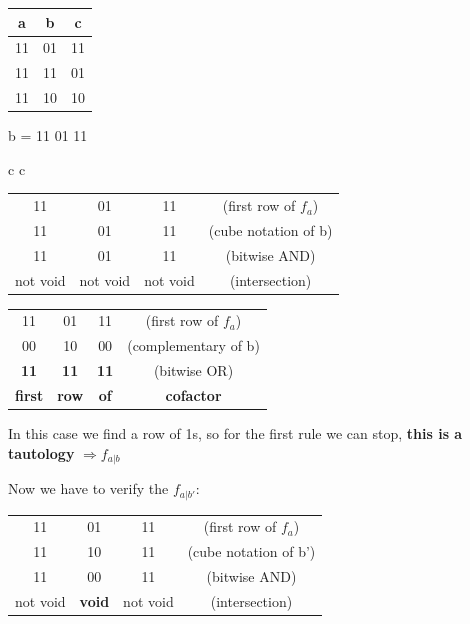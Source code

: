 \begin{center}
		\begin{tabular}{c | c | c}
		a & b & c \\ \hline
		11 & 01 & 11 \\ \hline
		11 & 11 & 01 \\ \hline 
		11 & 10 & 10 \\
	\end{tabular}
\end{center}

b = 11 01 11

\begin{center}
	\begin{tabular}{c c}
		\begin{tabular}{c c c c}
			11 & 01 & 11 & (first row of $f_{a}$) \\ 
			11 & 01 & 11 & (cube notation of b)\\ \hline 
			11 & 01 & 11 & (bitwise AND) \\ \hline
			not void & not void & not void & (intersection)
		\end{tabular}
		\quad\quad
		\begin{tabular}{c  c  c c}
			11 & 01 & 11 & (first row of $f_{a}$) \\ 
			00 & 10 & 00 & (complementary of b)\\ \hline 
			\textbf{11} & \textbf{11} & \textbf{11} & (bitwise OR) \\ \hline
			\textbf{first} & \textbf{row} & \textbf{of} & \textbf{cofactor} \\
		\end{tabular}
	\end{tabular}
	
	\bigskip
	In this case we find a row of 1s, so for the first rule we can stop, \textbf{this is a tautology} $\Longrightarrow f_{a|b}$
\end{center}

Now we have to verify the $f_{a|b'}$: 

\begin{center}
	\begin{tabular}{c c c c}
		11 & 01 & 11 & (first row of $f_{a}$) \\ 
		11 & 10 & 11 & (cube notation of b')\\ \hline 
		11 & 00 & 11 & (bitwise AND) \\ \hline
		not void & \textbf{void} & not void & (intersection)
	\end{tabular}
\end{center}

